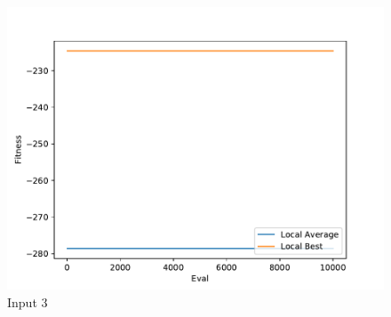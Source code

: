 \documentclass{standalone}
\begin{document}
\begin{figure}[!htb]
	\caption{Input 3}
	\label{fig:graph_3013}
	\includegraphics[width=\textwidth]{../graphs/graphs/3013.pdf}
\end{figure}
\end{document}
